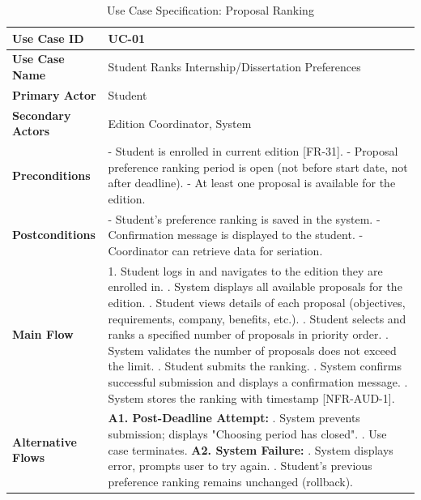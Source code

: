 \newpage
\renewcommand{\arraystretch}{1.5} 
\begin{xltabular}{\textwidth}{|l|X|}
    \caption{Use Case Specification: Proposal Ranking} \label{tab:UC-01} \\
    
    \hline
    \textbf{Use Case ID} & UC-01 \\ \hline
    \textbf{Use Case Name} & Student Ranks Internship/Dissertation Preferences \\ \hline
    \textbf{Primary Actor} & Student \\ \hline
    \textbf{Secondary Actors} & Edition Coordinator, System \\ \hline
    \textbf{Preconditions} &
        - Student is enrolled in current edition [FR-31]. \newline
        - Proposal preference ranking period is open (not before start date, not after deadline). \newline
        - At least one proposal is available for the edition.
        \\ \hline
    \textbf{Postconditions} &
        - Student's preference ranking is saved in the system. \newline
        - Confirmation message is displayed to the student. \newline
        - Coordinator can retrieve data for seriation.
        \\ \hline
    \textbf{Main Flow} &
        1. Student logs in and navigates to the edition they are enrolled in. . System displays all available proposals for the edition. . Student views details of each proposal (objectives, requirements, company, benefits, etc.). . Student selects and ranks a specified number of proposals in priority order. . System validates the number of proposals does not exceed the limit. . Student submits the ranking. . System confirms successful submission and displays a confirmation message. . System stores the ranking with timestamp [NFR-AUD-1]. \\ \hline
    \textbf{Alternative Flows} &
        \textbf{A1. Post-Deadline Attempt:} . System prevents submission; displays "Choosing period has closed". . Use case terminates. \newline
        \textbf{A2. System Failure:} . System displays error, prompts user to try again. . Student's previous preference ranking remains unchanged (rollback). \\ \hline
\end{xltabular}

